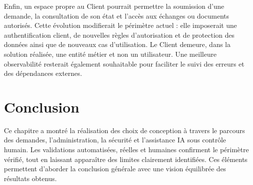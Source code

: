 Enfin, un espace propre au Client pourrait permettre la soumission d'une demande, la consultation de son état et l'accès aux échanges ou documents autorisés. Cette évolution modifierait le périmètre actuel : elle imposerait une authentification client, de nouvelles règles d'autorisation et de protection des données ainsi que de nouveaux cas d'utilisation. Le Client demeure, dans la solution réalisée, une entité métier et non un utilisateur. Une meilleure observabilité resterait également souhaitable pour faciliter le suivi des erreurs et des dépendances externes.

\section*{Conclusion}
{}

Ce chapitre a montré la réalisation des choix de conception à travers le parcours des demandes, l'administration, la sécurité et l'assistance IA sous contrôle humain. Les validations automatisées, réelles et humaines confirment le périmètre vérifié, tout en laissant apparaître des limites clairement identifiées. Ces éléments permettent d'aborder la conclusion générale avec une vision équilibrée des résultats obtenus.
